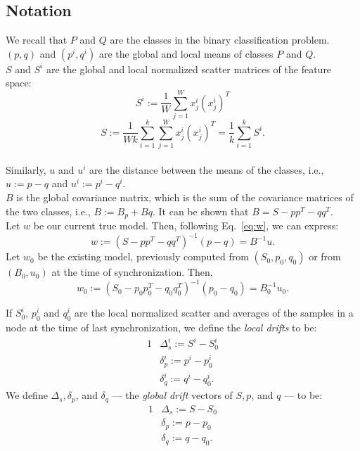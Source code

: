 \documentclass{vldb}
\begin{document}
\subsection{Notation}
\noindent
We recall that $P$ and $Q$ are the classes in the binary classification problem.
 $(p,q)$ and $(p^i,q^i)$  are the global and local means of classes $P$ and $Q$.
\\$S$ and $S^i$  are the global and local normalized scatter matrices of the feature space:
\begin{equation*}
S^i := \frac{1}{W}\sum_{j=1}^{W}x^i_j(x^i_j)^T
\end{equation*}
\begin{equation*}
S := \frac{1}{Wk}
\sum_{i=1}^k\sum_{j=1}^Wx^i_j(x^i_j)^T=\frac{1}{k}\sum_{i=1}^kS^i.
\end{equation*}
\\Similarly, $u$ and $u^i$ are the distance between the means of the classes, i.e., $u:=p - q$ and $u^i:=p^i - q^i$.
\\ $B$ is the global covariance matrix, which is the sum of the covariance matrices of the two classes, i.e., $B:=B_p+Bq$.
It can be shown that $B=S - pp^T - qq^T$.
\\Let $w$ be our current true model. Then, following Eq.~\ref{eq:w}, we can express:
\begin{equation}
w:=(S - pp^T - qq^T)^{-1}(p-q)=B^{-1}u.
\end{equation}
Let $w_0$ be the existing model, previously computed from $(S_0, p_0, q_0)$
or from $(B_0,u_0)$ at the time of synchronization.
Then,
\begin{equation}
w_0:=(S_0 - p_0p_0^T - q_0q_0^T)^{-1}(p_0-q_0)=B_0^{-1}u_0.
\end{equation}

If $S_0^i$, $p_0^i$ and $q_0^i$ are the local normalized scatter and averages
of the samples in a node at the time of last synchronization, we define the \textit{local drifts} to be:
\begin{alignat*}{1}
& \Delta_s^i:= S^i - S_0^i
\\ & \delta_p^i:= p^i - p_0^i
\\ & \delta_q^i:= q^i - q_0^i.
\end{alignat*}
We define $\Delta_s, \delta_p$, and $\delta_q$ --- the \textit{global drift} vectors of $S, p$, and $q$ --- to be:
\begin{alignat*}{1}
& \Delta_s:= S - S_0 \\
& \delta_p:= p - p_0 \\
& \delta_q := q - q_0.
\end{alignat*}
\end{document}
